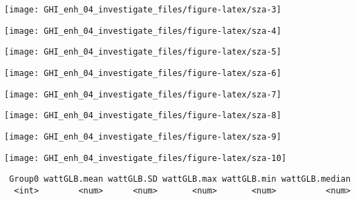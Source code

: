 \documentclass[
  10pt,
  a4paper,oneside]{article}
\begin{document}
\begin{center}\texttt{[image: GHI\_enh\_04\_investigate\_files/figure-latex/sza-3]} \end{center}

\begin{center}\texttt{[image: GHI\_enh\_04\_investigate\_files/figure-latex/sza-4]} \end{center}

\begin{center}\texttt{[image: GHI\_enh\_04\_investigate\_files/figure-latex/sza-5]} \end{center}

\begin{center}\texttt{[image: GHI\_enh\_04\_investigate\_files/figure-latex/sza-6]} \end{center}

\begin{center}\texttt{[image: GHI\_enh\_04\_investigate\_files/figure-latex/sza-7]} \end{center}

\begin{center}\texttt{[image: GHI\_enh\_04\_investigate\_files/figure-latex/sza-8]} \end{center}

\begin{center}\texttt{[image: GHI\_enh\_04\_investigate\_files/figure-latex/sza-9]} \end{center}

\begin{center}\texttt{[image: GHI\_enh\_04\_investigate\_files/figure-latex/sza-10]} \end{center}

\begin{verbatim}
 Group0 wattGLB.mean wattGLB.SD wattGLB.max wattGLB.min wattGLB.median
  <int>        <num>      <num>       <num>       <num>          <num>
\end{verbatim}
\end{document}
